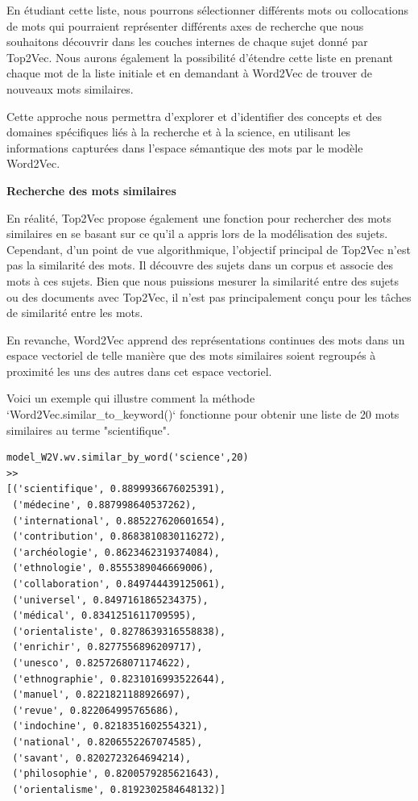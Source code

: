 En étudiant cette liste, nous pourrons sélectionner différents mots ou collocations de mots qui pourraient représenter différents axes de recherche que nous souhaitons découvrir dans les couches internes de chaque sujet donné par Top2Vec. Nous aurons également la possibilité d'étendre cette liste en prenant chaque mot de la liste initiale et en demandant à Word2Vec de trouver de nouveaux mots similaires.

Cette approche nous permettra d'explorer et d'identifier des concepts et des domaines spécifiques liés à la recherche et à la science, en utilisant les informations capturées dans l'espace sémantique des mots par le modèle Word2Vec.

\textbf{Recherche des mots similaires}

En réalité, Top2Vec propose également une fonction pour rechercher des mots similaires en se basant sur ce qu'il a appris lors de la modélisation des sujets. Cependant, d'un point de vue algorithmique, l'objectif principal de Top2Vec n'est pas la similarité des mots. Il découvre des sujets dans un corpus et associe des mots à ces sujets. Bien que nous puissions mesurer la similarité entre des sujets ou des documents avec Top2Vec, il n'est pas principalement conçu pour les tâches de similarité entre les mots.

En revanche, Word2Vec apprend des représentations continues des mots dans un espace vectoriel de telle manière que des mots similaires soient regroupés à proximité les uns des autres dans cet espace vectoriel.

Voici un exemple qui illustre comment la méthode `Word2Vec.similar\_to\_keyword()` fonctionne pour obtenir une liste de 20 mots similaires au terme "scientifique".
\begin{lstlisting}
model_W2V.wv.similar_by_word('science',20)
>>
[('scientifique', 0.8899936676025391),
 ('médecine', 0.887998640537262),
 ('international', 0.885227620601654),
 ('contribution', 0.8683810830116272),
 ('archéologie', 0.8623462319374084),
 ('ethnologie', 0.8555389046669006),
 ('collaboration', 0.849744439125061),
 ('universel', 0.8497161865234375),
 ('médical', 0.8341251611709595),
 ('orientaliste', 0.8278639316558838),
 ('enrichir', 0.8277556896209717),
 ('unesco', 0.8257268071174622),
 ('ethnographie', 0.8231016993522644),
 ('manuel', 0.8221821188926697),
 ('revue', 0.822064995765686),
 ('indochine', 0.8218351602554321),
 ('national', 0.8206552267074585),
 ('savant', 0.8202723264694214),
 ('philosophie', 0.8200579285621643),
 ('orientalisme', 0.8192302584648132)]
\end{lstlisting}

